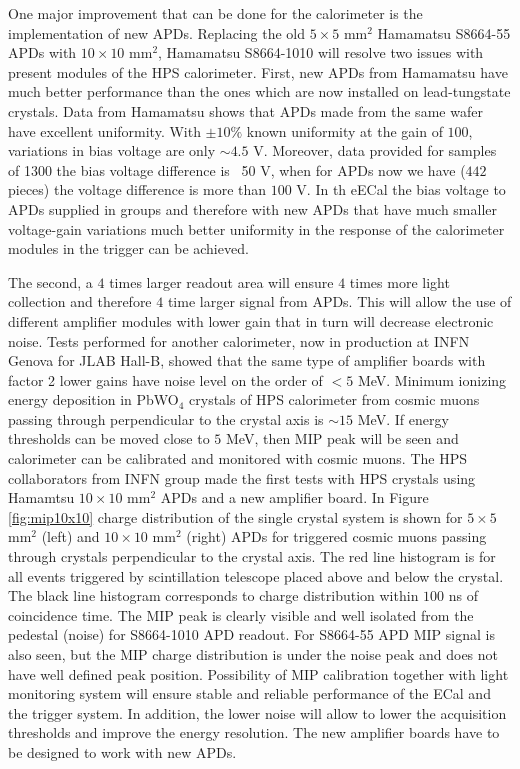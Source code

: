 One major improvement that can be done for the calorimeter is the implementation of new APDs. Replacing the old $5\times 5$ mm$^2$ Hamamatsu S8664-55 APDs with $10\times 10$ mm$^2$, Hamamatsu S8664-1010 will resolve two issues with present modules of the HPS calorimeter. First, new APDs from Hamamatsu have much better performance than the ones which are now installed on lead-tungstate crystals. Data from Hamamatsu shows that APDs made from the same wafer have excellent uniformity. With $\pm 10\%$ known uniformity at the gain of $100$, variations in bias voltage are only $\sim 4.5$ V. Moreover, data provided for samples of 1300 the bias voltage difference is ~50 V, when for APDs now we have ($442$ pieces) the voltage difference is more than $100$ V. In th eECal the bias voltage to APDs supplied in  groups and therefore with new APDs that have much smaller voltage-gain variations much better uniformity in the response of the calorimeter modules in the trigger can be achieved. 

The second, a $4$ times larger readout area will ensure $4$ times more light collection and therefore $4$ time larger signal from APDs. This will allow the use of different amplifier modules with lower gain that in turn will decrease electronic noise. Tests performed for another calorimeter, now in production at INFN Genova for JLAB Hall-B, showed that the same type of amplifier boards with factor 2 lower gains have noise level on the order of $<5$ MeV. Minimum ionizing energy deposition in PbWO$_4$ crystals of HPS calorimeter from cosmic muons passing through perpendicular to the crystal axis is $\sim 15$ MeV. If energy thresholds can be moved close to $5$ MeV, then MIP peak will be seen and calorimeter can be calibrated and monitored with cosmic muons. The HPS collaborators from INFN group made the first tests with HPS crystals using Hamamtsu $10\times 10$ mm$^2$ APDs and a new amplifier board. In Figure \ref{fig:mip10x10} charge distribution of the single crystal system is shown for $5\times 5$ mm$^2$ (left) and $10\times 10$ mm$^2$ (right) APDs for triggered cosmic muons passing through crystals perpendicular to the crystal axis. The red line histogram is for all events triggered by scintillation telescope placed above and below the crystal. The black line histogram corresponds to charge distribution within $100$ ns of coincidence time. The MIP peak is clearly visible and well isolated from the pedestal (noise) for S8664-1010 APD readout. For  S8664-55 APD MIP signal is also seen, but the MIP charge distribution is under the noise peak and does not have well defined peak position. Possibility of MIP calibration together with light monitoring system will ensure stable and reliable performance of the ECal and the trigger system. In addition, the lower noise will allow to lower the acquisition thresholds and improve the energy resolution. The new amplifier boards have to be designed to work with new APDs. 

